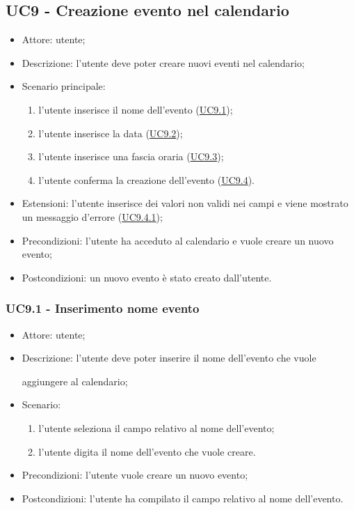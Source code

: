 

\subsection{UC9 - Creazione evento nel calendario}
\begin{itemize}
    \item Attore: utente;
    \item Descrizione: l'utente deve poter creare nuovi eventi nel calendario;
    \item Scenario principale:
        \begin{enumerate}
        \item l'utente inserisce il nome dell'evento (\hyperref[sec: UC9.1]{UC9.1});
        \item l'utente inserisce la data (\hyperref[sec: UC9.2]{UC9.2});
        \item l'utente inserisce una fascia oraria (\hyperref[sec: UC9.3]{UC9.3});
        \item l'utente conferma la creazione dell'evento (\hyperref[sec: UC9.4]{UC9.4}).
        \end{enumerate}
    \item Estensioni: l'utente inserisce dei valori non validi nei campi e viene mostrato un messaggio d'errore (\hyperref[sec: UC9.4.1]{UC9.4.1});
    \item Precondizioni: l'utente ha acceduto al calendario e vuole creare un nuovo evento;
    \item Postcondizioni: un nuovo evento è stato creato dall'utente.
\end{itemize}

\subsubsection{UC9.1 - Inserimento nome evento} \label{sec: UC9.1}
\begin{itemize}
    \item Attore: utente;
    \item Descrizione: l'utente deve poter inserire il nome dell'evento che vuole \par aggiungere al calendario;
    \item Scenario:
        \begin{enumerate}
        \item l'utente seleziona il campo relativo al nome dell'evento;
        \item l'utente digita il nome dell'evento che vuole creare.
        \end{enumerate}
    
    \item Precondizioni: l'utente vuole creare un nuovo evento;
    \item Postcondizioni: l'utente ha compilato il campo relativo al nome dell'evento.
\end{itemize}


